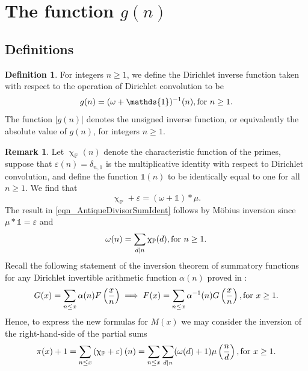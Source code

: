 \documentclass[11pt,reqno,a4letter]{article}
\numberwithin{equation}{section}
\numberwithin{figure}{section}
\numberwithin{table}{section}
\renewcommand{\chi}{\upchi}
\theoremstyle{plain}
\numberwithin{theorem}{section}
\theoremstyle{definition}
\newtheorem{remark}[theorem]{Remark}
\newtheorem{definition}[theorem]{Definition}
\theoremstyle{remark}
\newcommand{\mathtext}[1]{\text{\rm #1}}
\begin{document}
\section{The function $g(n)$} 
\label{Section_NewFormulasForgInvn_v2} 

\subsection{Definitions}

\begin{definition}
\label{def_gn_and_Absgn_v2} 
For integers $n \geq 1$, we define the Dirichlet inverse function 
taken with respect to the operation of Dirichlet convolution to be 
\[
g(n) = (\omega + \mathds{1})^{-1}(n), \mathtext{ for } n \geq 1. 
\]
The function $|g(n)|$ denotes the unsigned inverse function, 
or equivalently the absolute value of $g(n)$, for integers $n \geq 1$. 
\end{definition}

\begin{remark} 
\label{remark_MotivationForTheDefinitionOf_gn_v2}
Let $\chi_{\mathbb{P}}(n)$ denote the characteristic function of the primes, suppose that 
$\varepsilon(n) = \delta_{n,1}$ is the multiplicative identity 
with respect to Dirichlet convolution, and define the 
function $\mathds{1}(n)$ to be identically equal to one for all $n \geq 1$. 
We find that 
\begin{equation}
\label{eqn_AntiqueDivisorSumIdent} 
\chi_{\mathbb{P}} + \varepsilon = (\omega + \mathds{1}) \ast \mu. 
\end{equation} 
The result in \eqref{eqn_AntiqueDivisorSumIdent} follows by M\"obius inversion 
since $\mu \ast \mathds{1} = \varepsilon$ and 
\[
\omega(n) = \sum_{d|n} \chi_{\mathbb{P}}(d), \mathtext{ for } n \geq 1. 
\]
Recall the following statement of the 
inversion theorem of summatory functions for any 
Dirichlet invertible arithmetic function $\alpha(n)$ 
proved in \cite[\S 2.14]{APOSTOLANUMT}:
\begin{equation}
\label{eqn_ApostolStmt_ClassicSummatoryFuncInvThm_v1} 
G(x) = \sum_{n \leq x} \alpha(n) F\left(\frac{x}{n}\right) \implies 
     F(x) = \sum_{n \leq x} \alpha^{-1}(n) G\left(\frac{x}{n}\right), 
     \mathtext{ for } x \geq 1. 
\end{equation}
Hence, to express the new formulas for $M(x)$ 
we may consider the inversion of the right-hand-side of the partial sums 
\[
\pi(x) + 1 = \sum_{n \leq x} \left(\chi_{\mathbb{P}} + \varepsilon\right)(n) = 
     \sum_{n \leq x} \sum_{d|n} (\omega(d) + 1) \mu\left(\frac{n}{d}\right), 
	\mathtext{ for } x \geq 1. 
\]
\end{remark}
\end{document}
